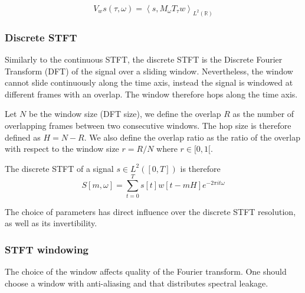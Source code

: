 \documentclass[american,]{article}
\theoremstyle{definition}
\theoremstyle{definition}
\theoremstyle{definition}
\theoremstyle{remark}
\begin{document}
\begin{equation}\label{eq:stft_operator}
V_w s(\tau,\omega) = \left\langle s, M_\omega T_\tau w\right\rangle_{L^2(\mathbb{R})}
\end{equation}

\hypertarget{discrete-stft}{%
\subsubsection{Discrete STFT}\label{discrete-stft}}

Similarly to the continuous STFT, the discrete STFT is the
Discrete Fourier Transform (DFT) of the signal over a sliding window.
Nevertheless, the window cannot slide continuously along the time axis,
instead the signal is windowed at different frames with an overlap.
The window therefore hops along the time axis.

Let \(N\) be the window size (DFT size), we define the overlap \(R\)
as the number of overlapping frames between two consecutive windows.
The hop size is therefore defined as \(H=N-R\).
We also define the overlap ratio as the ratio of the overlap
with respect to the window size \(r=R/N\) where \(r\in[0,1[\).

The discrete STFT of a signal \(s\in L^2([0,T])\) is therefore
\begin{equation}
S[m,\omega] = \sum_{t=0}^{T} s[t]w[t-mH]e^{-2\pi it\omega}
\end{equation}

The choice of parameters has direct influence over the discrete STFT
resolution, as well as its invertibility.

\hypertarget{stft-windowing}{%
\subsubsection{STFT windowing}\label{stft-windowing}}

The choice of the window affects quality of the Fourier transform.
One should choose a window with anti-aliasing and that distributes
spectral leakage.
\end{document}
